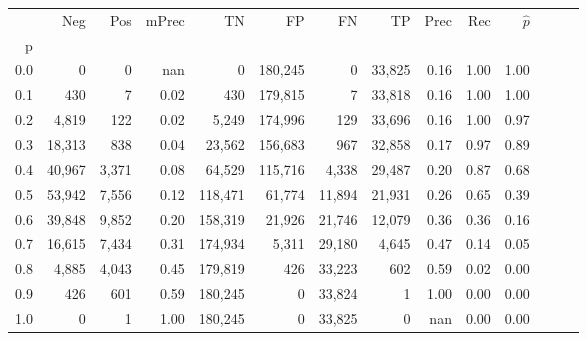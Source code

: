 \begin{tabular}{rrrrrrrrrrrrrr}
\toprule
{} &     Neg &    Pos & mPrec &       TN &       FP &      FN &      TP &  Prec &   Rec & $\hat{p}$ \\
p   &         &        &       &          &          &         &         &       &       &           \\
\midrule
0.0 &       0 &      0 &   nan &        0 &  180,245 &       0 &  33,825 &  0.16 &  1.00 &      1.00 \\
0.1 &     430 &      7 &  0.02 &      430 &  179,815 &       7 &  33,818 &  0.16 &  1.00 &      1.00 \\
0.2 &   4,819 &    122 &  0.02 &    5,249 &  174,996 &     129 &  33,696 &  0.16 &  1.00 &      0.97 \\
0.3 &  18,313 &    838 &  0.04 &   23,562 &  156,683 &     967 &  32,858 &  0.17 &  0.97 &      0.89 \\
0.4 &  40,967 &  3,371 &  0.08 &   64,529 &  115,716 &   4,338 &  29,487 &  0.20 &  0.87 &      0.68 \\
0.5 &  53,942 &  7,556 &  0.12 &  118,471 &   61,774 &  11,894 &  21,931 &  0.26 &  0.65 &      0.39 \\
0.6 &  39,848 &  9,852 &  0.20 &  158,319 &   21,926 &  21,746 &  12,079 &  0.36 &  0.36 &      0.16 \\
0.7 &  16,615 &  7,434 &  0.31 &  174,934 &    5,311 &  29,180 &   4,645 &  0.47 &  0.14 &      0.05 \\
0.8 &   4,885 &  4,043 &  0.45 &  179,819 &      426 &  33,223 &     602 &  0.59 &  0.02 &      0.00 \\
0.9 &     426 &    601 &  0.59 &  180,245 &        0 &  33,824 &       1 &  1.00 &  0.00 &      0.00 \\
1.0 &       0 &      1 &  1.00 &  180,245 &        0 &  33,825 &       0 &   nan &  0.00 &      0.00 \\
\bottomrule
\end{tabular}
